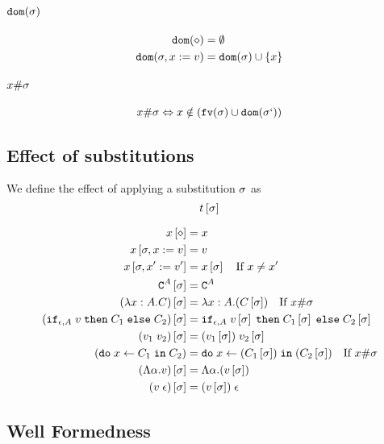 {    \paragraph{$\texttt{dom}(\sigma)$}
    \begin{align}
        \texttt{dom}(\diamond) & = \emptyset\\
        \texttt{dom}(\sigma, x:= v) & = \texttt{dom}(\sigma)\cup\left\{x\right\}
    \end{align}

    \paragraph{$x \# \sigma$}
    \begin{equation}
        x \# \sigma \Leftrightarrow x\notin(\texttt{fv}(\sigma)\cup\texttt{dom}(\sigma`))
    \end{equation}

    \subsection{Effect of substitutions}
        We define the effect of applying a substitution $\sigma$ as 
        $$t\left[\sigma\right]$$

        
        \begin{align}
            x\left[\diamond\right] & = x \\
            x\left[\sigma,x:= v\right] & = v \\
            x\left[\sigma,x':= v'\right] & = x\left[\sigma\right]\quad\text{If }x \neq x'\\
            \texttt{C}^{A}\left[\sigma\right] & = \texttt{C}^{A} \\
            (\lambda x : A. C)\left[\sigma\right] &= \lambda x : A. (C\left[\sigma\right])\quad\text{If }x\#\sigma\\
            (\texttt{if}_{\epsilon, A}\; v\; \texttt{then}\; C_1 \;\texttt{else} \; C_2)\left[\sigma\right] &= \texttt{if}_{\epsilon, A}\; v\left[\sigma\right]\; \texttt{then}\; C_1\left[\sigma\right] \;\texttt{else} \; C_2\left[\sigma\right]\\
            (v_1\; v_2)\left[\sigma\right]&= (v_1\left[\sigma\right])\; v_2\left[\sigma\right]\\
            (\texttt{do}\; x \leftarrow C_1 \;\texttt{in}\; C_2)&= \texttt{do}\; x \leftarrow (C_1\left[\sigma\right]) \;\texttt{in}\; (C_2\left[\sigma\right])\quad\text{If } x\#\sigma\\
            (\Lambda \alpha. v)\left[\sigma\right] & = \Lambda \alpha. (v\left[\sigma\right])\\
            (v\;\epsilon)\left[\sigma\right] & = (v\left[\sigma\right])\;\epsilon\\
        \end{align}
    \subsection{Well Formedness}
    
}
